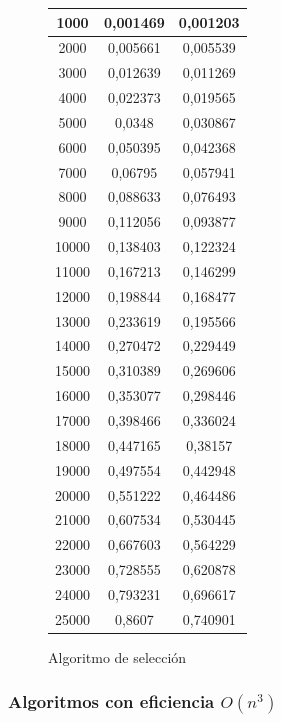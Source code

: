 \documentclass[12pt,spanish]{article}
\begin{document}
\begin{figure}[H]
\begin{tabular}{|c|c|c|}
\hline
1000 & 0,001469 & 0,001203 \\
\hline
2000 & 0,005661 & 0,005539\\
\hline
3000 & 0,012639 & 0,011269\\
\hline
4000 & 0,022373 & 0,019565\\
\hline
5000 & 0,0348 & 0,030867\\
\hline
6000 & 0,050395 & 0,042368\\
\hline
7000 & 0,06795 & 0,057941\\
\hline
8000 & 0,088633 & 0,076493\\
\hline
9000 & 0,112056 & 0,093877\\
\hline
10000 & 0,138403 & 0,122324\\
\hline
11000 & 0,167213 & 0,146299\\
\hline
12000 & 0,198844 & 0,168477\\
\hline
13000 & 0,233619 & 0,195566\\
\hline
14000 & 0,270472 & 0,229449\\
\hline
15000 & 0,310389 & 0,269606\\
\hline
16000 & 0,353077 & 0,298446\\
\hline
17000 & 0,398466 & 0,336024\\
\hline
18000 & 0,447165 & 0,38157\\
\hline
19000 & 0,497554 & 0,442948\\
\hline
20000 & 0,551222 & 0,464486\\
\hline
21000 & 0,607534 & 0,530445\\
\hline
22000 & 0,667603 & 0,564229\\
\hline
23000 & 0,728555 & 0,620878\\
\hline
24000 & 0,793231 & 0,696617\\
\hline
25000 & 0,8607 & 0,740901\\
\hline
\end{tabular}
\caption{Algoritmo de selección}
\end{figure}
\subsubsection{Algoritmos con eficiencia $O(n^3)$}
\end{document}
